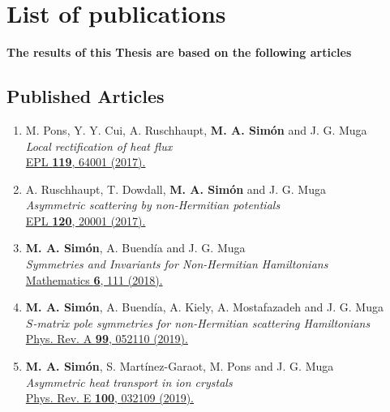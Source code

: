 \chapter{List of publications} %
\label{Publications}
 {\bf The results of this Thesis are based on the following articles}
\section*{Published Articles}

\begin{enumerate}

  \item M. Pons, Y. Y. Cui, A. Ruschhaupt, {\bf M. A. Sim\'{o}n} and J. G. Muga\\
  {\it Local rectification of heat flux}\\
  \href{https://doi.org/10.1209/0295-5075/119/64001}{EPL {\bf 119}, 64001 (2017).}

  \item A. Ruschhaupt, T. Dowdall, {\bf M. A. Sim\'{o}n} and J. G. Muga\\
  {\it Asymmetric scattering by non-Hermitian potentials}\\
  \href{https://doi.org/10.1209/0295-5075/120/20001}{EPL {\bf 120}, 20001 (2017).}

  \item {\bf M. A. Sim\'{o}n}, A. Buend\'{i}a and J. G. Muga\\
  {\it Symmetries and Invariants for Non-Hermitian Hamiltonians}\\
  \href{https://doi.org/10.3390/math6070111}{Mathematics {\bf 6}, 111 (2018).}

  \item {\bf M. A. Sim\'{o}n}, A. Buend\'{i}a, A. Kiely, A. Mostafazadeh and J. G. Muga\\
  {\it $S$-matrix pole symmetries for non-Hermitian scattering Hamiltonians}\\
  \href{https://doi.org/10.1103/PhysRevA.99.052110}{Phys. Rev. A {\bf 99}, 052110 (2019).}

  \item {\bf M. A. Sim\'{o}n}, S. Mart\'{i}nez-Garaot, M. Pons and J. G. Muga\\
  {\it Asymmetric heat transport in ion crystals}\\
  \href{https://doi.org/10.1103/PhysRevE.100.032109}{Phys. Rev. E {\bf 100}, 032109 (2019).}


\end{enumerate}
